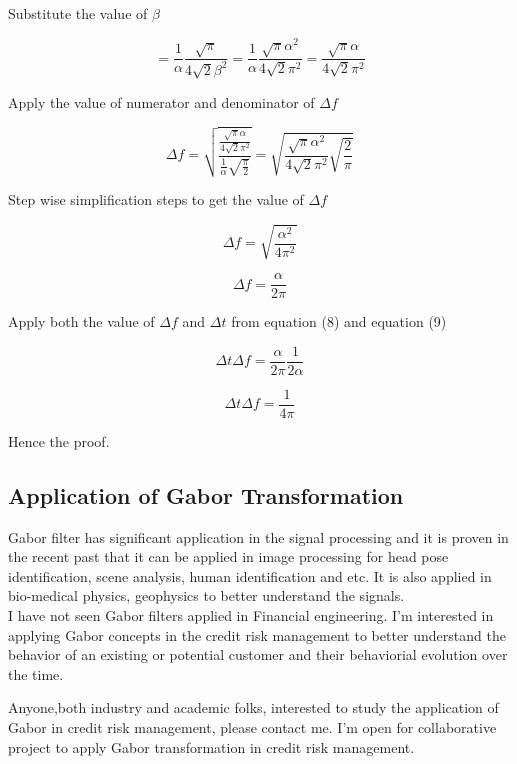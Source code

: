 \documentclass[paper=a4, fontsize=11pt,twoside]{scrartcl}		%
\begin{document}
Substitute the value of $\beta$

\begin{equation*}
 = \frac{1}{\alpha }\frac{\sqrt{\pi}}{4 \sqrt{2}\beta ^2}  = \frac{1}{\alpha }\frac{\sqrt{\pi} \alpha^2}{4 \sqrt{2}\pi ^2} = \frac{\sqrt{\pi} \alpha}{4 \sqrt{2}\pi ^2}
\end{equation*}

Apply the value of numerator and denominator of $\Delta f$

\begin{equation*}
\Delta f = \sqrt{\frac{\frac{\sqrt{\pi} \alpha}{4 \sqrt{2}\pi ^2}}{\frac{1}{\alpha} \sqrt{\frac{\pi}{2 }}}} = \sqrt{\frac{\sqrt{\pi} \alpha^2}{4 \sqrt{2}\pi ^2} \sqrt{\frac{2}{\pi }}}
\end{equation*}

Step wise simplification steps to get the value of $\Delta f$

\begin{equation*}
\Delta f =  \sqrt{\frac{\alpha ^2}{4 \pi ^2}}
\end{equation*}


\begin{equation}
\Delta f =  \frac{\alpha}{2 \pi}
\end{equation}

Apply both the value of $\Delta f$ and $\Delta t$ from equation (8) and equation (9)

\begin{equation*}
\Delta t \Delta f =  \frac{\alpha}{2 \pi} \frac{1}{2 \alpha }
\end{equation*}

\begin{equation*}
\boxed{\Delta t \Delta f =  \frac{1}{4 \pi}}
\end{equation*}

Hence the proof.

\subsection{Application of Gabor Transformation}
Gabor filter has significant application in the signal processing and it is proven in the recent past that it can be applied in image processing for head pose identification, scene analysis, human identification and etc. It is also applied in bio-medical physics, geophysics to better understand the signals. \\

I have not seen Gabor filters applied in Financial engineering. I'm interested in applying Gabor concepts in the credit risk management to better understand the behavior of an existing or potential customer and their behaviorial evolution over the time.

Anyone,both industry and academic folks, interested to study the application of Gabor in credit risk management, please contact me. I'm open for collaborative project to apply Gabor transformation in credit risk management.
\end{document}
